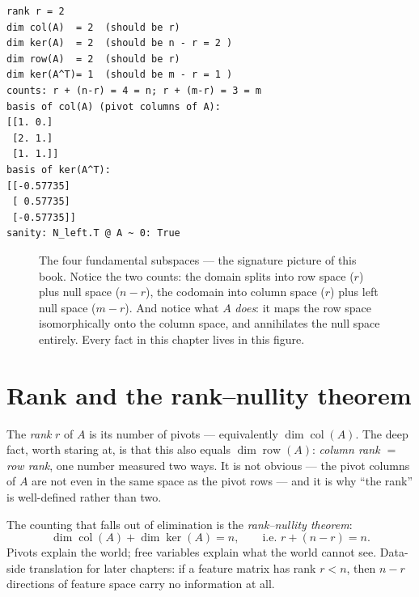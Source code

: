 \begin{lstlisting}[caption={Output of listing~\ref{lst:four}. Both counting laws verify on the nose: $r+(n-r)=n$, $r+(m-r)=m$. SciPy returns the normalized $(-1,1,-1)/\sqrt3\approx(-0.577,0.577,-0.577)$ for the left null space.}]
rank r = 2
dim col(A)  = 2  (should be r)
dim ker(A)  = 2  (should be n - r = 2 )
dim row(A)  = 2  (should be r)
dim ker(A^T)= 1  (should be m - r = 1 )
counts: r + (n-r) = 4 = n; r + (m-r) = 3 = m
basis of col(A) (pivot columns of A):
[[1. 0.]
 [2. 1.]
 [1. 1.]]
basis of ker(A^T):
[[-0.57735]
 [ 0.57735]
 [-0.57735]]
sanity: N_left.T @ A ~ 0: True
\end{lstlisting}

\begin{figure}[htbp]
\centering

\caption{The four fundamental subspaces — the signature picture of this book. Notice the two counts: the domain splits into row space ($r$) plus null space ($n-r$), the codomain into column space ($r$) plus left null space ($m-r$). And notice what $A$ \emph{does}: it maps the row space isomorphically onto the column space, and annihilates the null space entirely. Every fact in this chapter lives in this figure.}
\label{fig:foursub}
\end{figure}

\section{Rank and the rank--nullity theorem}\label{sec:ranknullity}

The \emph{rank} $r$ of $A$ is its number of pivots — equivalently $\dim\operatorname{col}(A)$. The deep fact, worth staring at, is that this also equals $\dim\operatorname{row}(A)$: \emph{column rank $=$ row rank}, one number measured two ways. It is not obvious — the pivot columns of $A$ are not even in the same space as the pivot rows — and it is why ``the rank'' is well-defined rather than two.

The counting that falls out of elimination is the \emph{rank--nullity theorem}:
\[
  \dim\operatorname{col}(A) + \dim\ker(A) = n, \qquad\text{i.e. } r + (n-r) = n.
\]
Pivots explain the world; free variables explain what the world cannot see. Data-side translation for later chapters: if a feature matrix has rank $r<n$, then $n-r$ directions of feature space carry no information at all.

